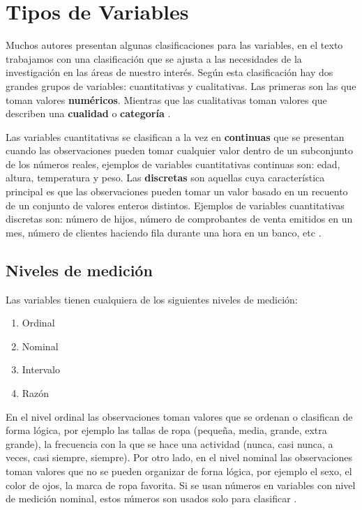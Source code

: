 \documentclass[letterpaper,]{book}
\providecommand{\tightlist}{%
  \setlength{\itemsep}{0pt}\setlength{\parskip}{0pt}}
\begin{document}
\hypertarget{tipos-de-variables}{%
\section{Tipos de Variables}\label{tipos-de-variables}}

Muchos autores presentan algunas clasificaciones para las variables, en el texto trabajamos con una clasificación que se ajusta a las necesidades de la investigación en las áreas de nuestro interés. Según esta clasificación hay dos grandes grupos de variables: cuantitativas y cualitativas. Las primeras son las que toman valores \textbf{numéricos}. Mientras que las cualitativas toman valores que describen una \textbf{cualidad} o \textbf{categoría} \citep{ross2008}.

Las variables cuantitativas se clasifican a la vez en \textbf{continuas} que se presentan cuando las observaciones pueden tomar cualquier valor dentro de un subconjunto de los números reales, ejemplos de variables cuantitativas continuas son: edad, altura, temperatura y peso. Las \textbf{discretas} son aquellas cuya característica principal es que las observaciones pueden tomar un valor basado en un recuento de un conjunto de valores enteros distintos. Ejemplos de variables cuantitativas discretas son: número de hijos, número de comprobantes de venta emitidos en un mes, número de clientes haciendo fila durante una hora en un banco, etc \citep{devore2012}.

\hypertarget{niveles-de-medicion}{%
\subsection{Niveles de medición}\label{niveles-de-medicion}}

Las variables tienen cualquiera de los siguientes niveles de medición:

\begin{enumerate}
\def\labelenumi{\arabic{enumi}.}
\tightlist
\item
  Ordinal
\item
  Nominal
\item
  Intervalo
\item
  Razón
\end{enumerate}

En el nivel ordinal las observaciones toman valores que se ordenan o clasifican de forma lógica, por ejemplo las tallas de ropa (pequeña, media, grande, extra grande), la frecuencia con la que se hace una actividad (nunca, casi nunca, a veces, casi siempre, siempre). Por otro lado, en el nivel nominal las observaciones toman valores que no se pueden organizar de forna lógica, por ejemplo el sexo, el color de ojos, la marca de ropa favorita. Si se usan números en variables con nivel de medición nominal, estos números son usados solo para clasificar \citep{barrow2006, cleff2013}.
\end{document}

